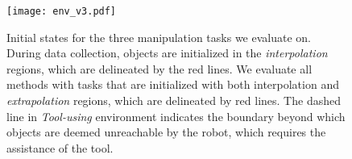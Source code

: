 \documentclass[letterpaper, 10 pt, conference]{ieeeconf}
\begin{document}
\begin{figure}[t]
	\centering
    \texttt{[image: env\_v3.pdf]}
	\caption{Initial states for the three manipulation tasks we evaluate on. During data collection, objects are initialized in the \emph{interpolation} regions, which are delineated by the red lines. We evaluate all methods with tasks that are initialized with both interpolation and \emph{extrapolation} regions, which are delineated by red lines. The dashed line in \emph{Tool-using} environment indicates the boundary beyond which objects are deemed unreachable by the robot, which requires the assistance of the tool.}
	
	\label{fig:exps}
	
\end{figure}
\begin{table}[]
\centering
\caption{\textbf{Quantitative Evaluation in the \textit{Lifting} environment}}
\label{exp:lifting}
\end{table}
\end{document}
